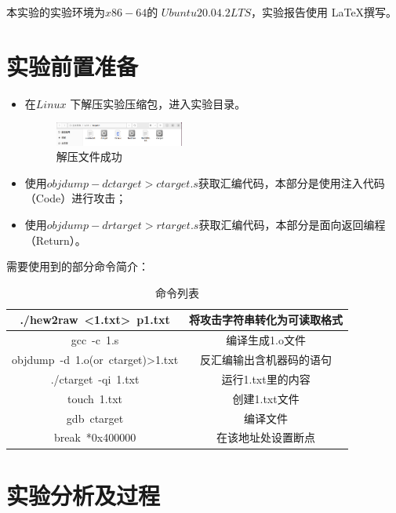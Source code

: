 本实验的实验环境为$ x86-64 $的 $ Ubuntu 20.04.2 LTS $，实验报告使用 \LaTeX 撰写。

\section{实验前置准备}
\begin{itemize}

  \item 在$ Linux $ 下解压实验压缩包，进入实验目录。
    \begin{figure} [H]
    \centering
    \includegraphics[width=0.4\textwidth]{Decompression.png}
    \caption{解压文件成功}
\end{figure}

  \item 使用$ objdump -d ctarget > ctarget.s $获取汇编代码，本部分是使用注入代码（Code）进行攻击；
  \item 使用$ objdump -d rtarget > rtarget.s $获取汇编代码，本部分是面向返回编程（Return）。
  
\end{itemize}

需要使用到的部分命令简介：

\begin{table}[h!]
  \centering
  \begin{tabular}{|c|c|}
      \hline
      ./hew2raw <1.txt> p1.txt &  将攻击字符串转化为可读取格式  \\
      \hline
      gcc -c 1.s & 编译生成1.o文件   \\
      \hline
      objdump -d 1.o(or ctarget)>1.txt & 反汇编输出含机器码的语句 \\
      \hline
      ./ctarget -qi 1.txt &运行1.txt里的内容 \\
      \hline
      touch 1.txt & 创建1.txt文件 \\
      \hline
      gdb ctarget & 编译文件 \\ 
      \hline
      break *0x400000 & 在该地址处设置断点 \\
      \hline
  \end{tabular}
  \caption{命令列表}
\end{table}

\section{实验分析及过程}

